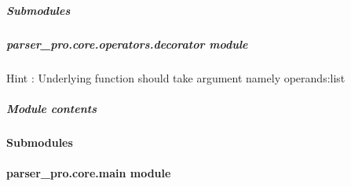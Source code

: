 \documentclass[letterpaper,10pt,english]{sphinxmanual}
\begin{document}
\subparagraph{Submodules}
\label{\detokenize{parser_pro.core.operators:submodules}}

\subparagraph{parser\_pro.core.operators.decorator module}
\label{\detokenize{parser_pro.core.operators:module-parser_pro.core.operators.decorator}}\label{\detokenize{parser_pro.core.operators:parser-pro-core-operators-decorator-module}}

\begin{fulllineitems}
\label{\detokenize{parser_pro.core.operators:parser_pro.core.operators.decorator.operator}}
\pysigstartsignatures
{}
\pysigstopsignatures
\sphinxAtStartPar
Hint : Underlying function should take argument namely  operands:list

\end{fulllineitems}



\subparagraph{Module contents}
\label{\detokenize{parser_pro.core.operators:module-parser_pro.core.operators}}\label{\detokenize{parser_pro.core.operators:module-contents}}

\paragraph{Submodules}
\label{\detokenize{parser_pro.core:submodules}}

\paragraph{parser\_pro.core.main module}
\label{\detokenize{parser_pro.core:module-parser_pro.core.main}}\label{\detokenize{parser_pro.core:parser-pro-core-main-module}}
\end{document}
